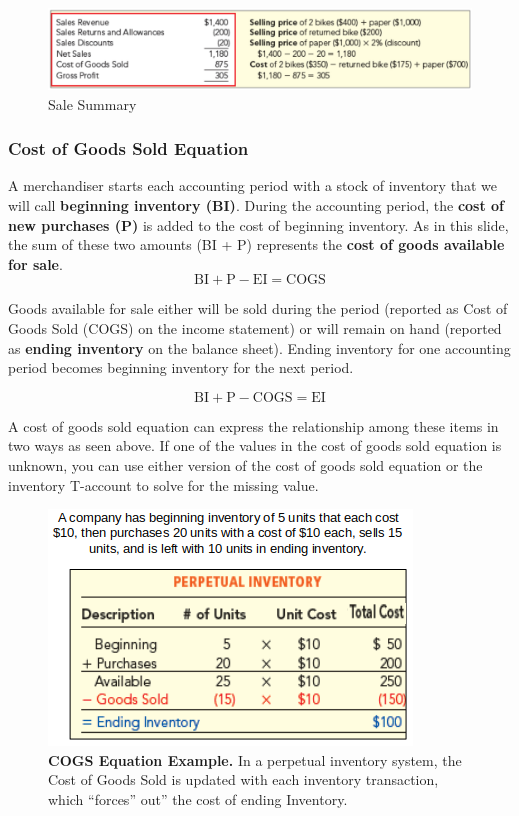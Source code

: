 \documentclass[../main.tex]{subfiles}
\begin{document}
	\begin{figure}[ht]
	\centering
	\includegraphics[width=1\columnwidth]{images/c7/summary_sales.png}
	\caption{Sale Summary}	
	\end{figure}

	\subsubsection{Cost of Goods Sold Equation}
	
	A merchandiser starts each accounting period with a stock of inventory that 
	we will call \textbf{beginning inventory (BI)}. During the accounting 
	period, the 
	\textbf{cost of new purchases (P)} is added to the cost of beginning 
	inventory. As 
	in this slide, the sum of these two amounts (BI + P) represents the 
	\textbf{cost of 
	goods available for sale}.
	\[
	\textrm{BI} + \textrm{P} - \textrm{EI} = \textrm{COGS}
 	\]


	Goods available for sale either will be sold 
	during the period (reported as Cost of Goods Sold (COGS) on the income 
	statement) or will remain on hand (reported as \textbf{ending inventory} on 
	the 
	balance sheet). Ending inventory for one accounting period becomes 
	beginning inventory for the next period. 
	
	\[
	\textrm{BI} + \textrm{P} - \textrm{COGS} = \textrm{EI}
	\]

	A cost of goods sold equation can express the relationship among these 
	items in two ways as seen above. If one of the values in the cost of goods 
	sold equation is unknown, you can use either version of the cost of goods 
	sold equation or the inventory T-account to solve for the missing value.
	\begin{figure}[ht]
		\centering
		\includegraphics[width=1\columnwidth]{images/c7/cogs_equation.png}
		\caption{\textbf{COGS Equation Example.} In a perpetual inventory 
		system, the Cost of Goods Sold is updated with each inventory 
		transaction, which “forces” out” the cost of ending Inventory.}	
	\end{figure}
	
\end{document}

